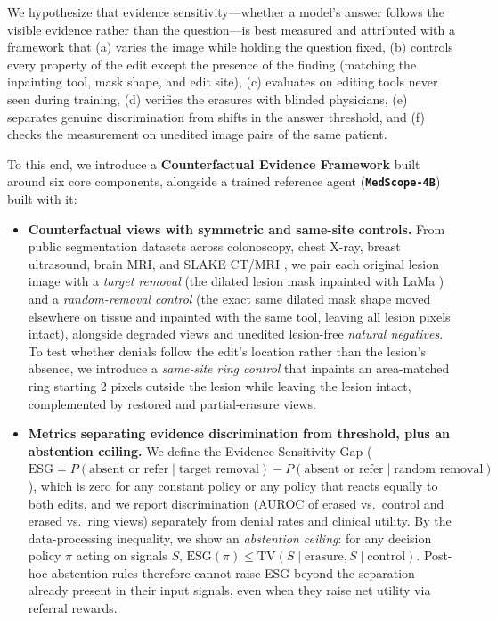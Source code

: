 \documentclass[5p,times,twocolumn,authoryear]{elsarticle}
\begin{document}
We hypothesize that evidence sensitivity---whether a model's answer follows the visible evidence rather than the question---is best measured and attributed with a framework that (a) varies the image while holding the question fixed, (b) controls every property of the edit except the presence of the finding (matching the inpainting tool, mask shape, and edit site), (c) evaluates on editing tools never seen during training, (d) verifies the erasures with blinded physicians, (e) separates genuine discrimination from shifts in the answer threshold, and (f) checks the measurement on unedited image pairs of the same patient.

To this end, we introduce a \textbf{Counterfactual Evidence Framework} built around six core components, alongside a trained reference agent (\textbf{\texttt{MedScope-4B}}) built with it:
\begin{itemize}[leftmargin=*,nosep]
    \item \textbf{Counterfactual views with symmetric and same-site controls.} From public segmentation datasets across colonoscopy, chest X-ray, breast ultrasound, brain MRI, and SLAKE CT/MRI \citep{liu2021slake,jha2020kvasir,borgli2020hyperkvasir,liu2020chestxdet,al2020dataset,buda2019association}, we pair each original lesion image with a \emph{target removal} (the dilated lesion mask inpainted with LaMa \citep{suvorov2022lama}) and a \emph{random-removal control} (the exact same dilated mask shape moved elsewhere on tissue and inpainted with the same tool, leaving all lesion pixels intact), alongside degraded views and unedited lesion-free \emph{natural negatives}. To test whether denials follow the edit's location rather than the lesion's absence, we introduce a \emph{same-site ring control} that inpaints an area-matched ring starting 2 pixels outside the lesion while leaving the lesion intact, complemented by restored and partial-erasure views.
    \item \textbf{Metrics separating evidence discrimination from threshold, plus an abstention ceiling.} We define the Evidence Sensitivity Gap ($\text{ESG} = P(\text{absent or refer} \mid \text{target removal}) - P(\text{absent or refer} \mid \text{random removal})$), which is zero for any constant policy or any policy that reacts equally to both edits, and we report discrimination (AUROC of erased vs.\ control and erased vs.\ ring views) separately from denial rates and clinical utility. By the data-processing inequality, we show an \emph{abstention ceiling}: for any decision policy $\pi$ acting on signals $S$, $\text{ESG}(\pi) \le \text{TV}(S \mid \text{erasure}, S \mid \text{control})$. Post-hoc abstention rules therefore cannot raise ESG beyond the separation already present in their input signals, even when they raise net utility via referral rewards.

\end{itemize}
\end{document}
